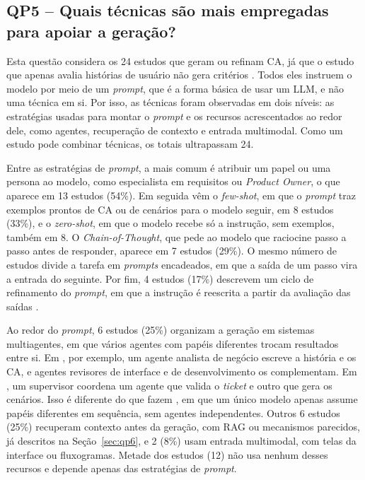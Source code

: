 \subsection{QP5 -- Quais técnicas são mais empregadas para apoiar a geração?}
\label{sec:qp5}

Esta questão considera os 24 estudos que geram ou refinam CA, já que o estudo que apenas avalia histórias de usuário não gera critérios \cite{ma2026}. Todos eles instruem o modelo por meio de um \textit{prompt}, que é a forma básica de usar um LLM, e não uma técnica em si. Por isso, as técnicas foram observadas em dois níveis: as estratégias usadas para montar o \textit{prompt} e os recursos acrescentados ao redor dele, como agentes, recuperação de contexto e entrada multimodal. Como um estudo pode combinar técnicas, os totais ultrapassam 24.

Entre as estratégias de \textit{prompt}, a mais comum é atribuir um papel ou uma persona ao modelo, como especialista em requisitos ou \textit{Product Owner}, o que aparece em 13 estudos (54\%). Em seguida vêm o \textit{few-shot}, em que o \textit{prompt} traz exemplos prontos de CA ou de cenários para o modelo seguir, em 8 estudos (33\%), e o \textit{zero-shot}, em que o modelo recebe só a instrução, sem exemplos, também em 8. O \textit{Chain-of-Thought}, que pede ao modelo que raciocine passo a passo antes de responder, aparece em 7 estudos (29\%). O mesmo número de estudos divide a tarefa em \textit{prompts} encadeados, em que a saída de um passo vira a entrada do seguinte. Por fim, 4 estudos (17\%) descrevem um ciclo de refinamento do \textit{prompt}, em que a instrução é reescrita a partir da avaliação das saídas \cite{ferreira2025,jurgelaitis2026,avasiloaie2025,khelifa2026}.

Ao redor do \textit{prompt}, 6 estudos (25\%) organizam a geração em sistemas multiagentes, em que vários agentes com papéis diferentes trocam resultados entre si. Em , por exemplo, um agente analista de negócio escreve a história e os CA, e agentes revisores de interface e de desenvolvimento os complementam. Em , um supervisor coordena um agente que valida o \textit{ticket} e outro que gera os cenários. Isso é diferente do que fazem , em que um único modelo apenas assume papéis diferentes em sequência, sem agentes independentes. Outros 6 estudos (25\%) recuperam contexto antes da geração, com RAG ou mecanismos parecidos, já descritos na Seção~\ref{sec:qp6}, e 2 (8\%) usam entrada multimodal, com telas da interface ou fluxogramas. Metade dos estudos (12) não usa nenhum desses recursos e depende apenas das estratégias de \textit{prompt}.

